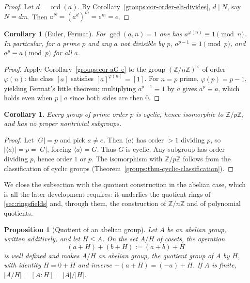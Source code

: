\documentclass[11pt,a4paper]{article}
\newtheorem{proposition}[theorem]{Proposition}
\newtheorem{corollary}[theorem]{Corollary}
\theoremstyle{definition}
\theoremstyle{remark}
\newcommand{\Z}{\ensuremath{\mathbb{Z}}}
\DeclareMathOperator{\ord}{ord}
\begin{document}
\begin{proof}
Let \(d = \ord(a)\). By Corollary~\ref{groups:cor-order-elt-divides}, \(d \mid N\), say \(N = dm\). Then \(a^N = (a^d)^m = e^m = e\).
\end{proof}

\begin{corollary}[Euler, Fermat]\label{groups:cor-euler-fermat}
For \(\gcd(a,n)=1\) one has \(a^{\varphi(n)} \equiv 1 \pmod n\). In particular, for a prime \(p\) and any \(a\) not divisible by \(p\), \(a^{p-1} \equiv 1 \pmod p\), and \(a^p \equiv a \pmod p\) for all \(a\).
\end{corollary}

\begin{proof}
Apply Corollary~\ref{groups:cor-aG-e} to the group \((\Z/n\Z)^\times\) of order \(\varphi(n)\): the class \([a]\) satisfies \([a]^{\varphi(n)} = [1]\). For \(n = p\) prime, \(\varphi(p) = p-1\), yielding Fermat's little theorem; multiplying \(a^{p-1}\equiv 1\) by \(a\) gives \(a^p \equiv a\), which holds even when \(p \mid a\) since both sides are then \(0\).
\end{proof}

\begin{corollary}\label{groups:cor-prime-cyclic}
Every group of prime order \(p\) is cyclic, hence isomorphic to \(\Z/p\Z\), and has no proper nontrivial subgroups.
\end{corollary}

\begin{proof}
Let \(|G| = p\) and pick \(a \neq e\). Then \(\langle a\rangle\) has order \(>1\) dividing \(p\), so \(|\langle a\rangle| = p = |G|\), forcing \(\langle a\rangle = G\). Thus \(G\) is cyclic. Any subgroup has order dividing \(p\), hence order \(1\) or \(p\). The isomorphism with \(\Z/p\Z\) follows from the classification of cyclic groups (Theorem~\ref{groups:thm-cyclic-classification}).
\end{proof}

We close the subsection with the quotient construction in the abelian case, which is all the later development requires: it underlies the quotient rings of \cref{sec:ringsfields} and, through them, the construction of \(\Z/n\Z\) and of polynomial quotients.

\begin{proposition}[Quotient of an abelian group]\label{groups:prop-quotient-abelian}
Let \(A\) be an abelian group, written additively, and let \(H \le A\). On the set \(A/H\) of cosets, the operation
\[
(a + H) + (b + H) := (a + b) + H
\]
is well defined and makes \(A/H\) an abelian group, the \emph{quotient group} of \(A\) by \(H\), with identity \(H = 0 + H\) and inverse \(-(a+H) = (-a) + H\). If \(A\) is finite, \(|A/H| = [A:H] = |A|/|H|\).
\end{proposition}
\end{document}
